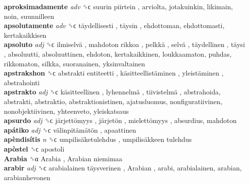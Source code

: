 \textbf{aproksimadamente} \emph{adv}  ␝ϲ   suurin piirtein , arviolta, jotakuinkin, likimain, noin, suunnilleen  \\
\textbf{apsolutamente} \emph{adv}  ␝ϲ   täydellisesti ,  täysin , ehdottoman, ehdottomasti, kertakaikkisen  \\
\textbf{apsoluto} \emph{adj}  ␝ϲ   ilmiselvä ,  mahdoton  rikkoa ,  pelkkä ,  selvä ,  täydellinen ,  täysi , absoluutti, absoluuttinen, ehdoton, kertakaikkinen, loukkaamaton, puhdas, rikkomaton, silkka, suoranainen, yksinvaltainen  \\
\textbf{apstrakshon} ␝ϲ   abstrakti entiteetti ,  käsitteellistäminen ,  yleistäminen , abstrahointi  \\
\textbf{apstrakto} \emph{adj}  ␝ϲ   käsitteellinen ,  lyhennelmä ,  tiivistelmä , abstrahoida, abstrakti, abstraktio, abstraktionistinen, ajatusluomus, nonfiguratiivinen, nonobjektiivinen, yhteenveto, yleiskatsaus  \\
\textbf{apsurdo} \emph{adj}  ␝ϲ   järjettömyys ,  järjetön ,  mielettömyys , absurdius, mahdoton  \\
\textbf{apátiko} \emph{adj}  ␝ϲ   välinpitämätön , apaattinen  \\
\textbf{apèndisítis} \emph{n}  ␝ϲ   umpilisäketulehdus ,  umpilisäkkeen tulehdus   \\
\textbf{apòstel} ␝ϲ  apostoli  \\
\textbf{Arabia} ␝α   Arabia ,  Arabian niemimaa   \\
\textbf{arabir} \emph{adj}  ␝ϲ   arabialainen täysverinen ,  Arabian , arabi, arabialainen, arabian, arabianhevonen  \\
